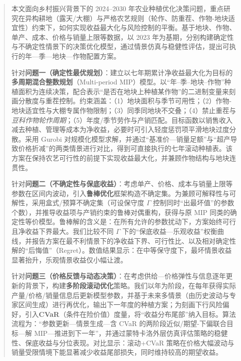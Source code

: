 



\begin{abstract}
    \begingroup
    \setlength{\baselineskip}{17.4pt}%
    
本文面向乡村振兴背景下的 2024--2030 年农业种植优化决策问题，重点研究在异构耕地（露天/大棚）与严格农艺规则（轮作、防重茬、作物-地块适宜性）约束下，如何实现收益最大化与风险控制的平衡。基于地块、作物、单产、成本、价格与销量上限等数据，以 2023 年为基期，分别构建确定性与不确定性情景下的决策优化模型，通过情景仿真与稳健性评估，提出可执行的年—季—地块—作物配置方案。
    
针对\textbf{问题一（确定性最优规划）}：建立以七年期累计净收益最大化为目标的\textbf{多周期混合整数规划}（Multi-period MIP）模型。以“年–季–地块–作物”种植面积为连续决策，配合表示“是否在地块上种植某作物”的二进制变量来刻画分散度与重茬控制。约束涵盖：（1）地块面积与季节可用性；（2）作物-地块适宜性与大棚专属作物限制；（3）同季同地块不交叠；（4）禁止重茬与\emph{豆科作物轮作周期}；（5）年度/季节劳作与产销匹配。目标函数以销售收入减去种植、管理等成本为净收益，必要时可引入轻度惩罚项平滑地块过度分散。采用 Gurobi 对规模化模型求解，并通过“基准价—销量足额”与“超产导致价格折减”的两类情景进行对比，得到可直接执行的七年滚动种植表。该方案在保持农艺可行性的前提下实现收益最大化，并兼顾作物结构与地块连贯性。
    
针对\textbf{问题二（不确定性与保底收益）}：考虑单产、价格、成本与销量上限等参数在区间内波动，引入\textbf{鲁棒优化}框架构造不确定集。为兼顾可解释性与可解性，采用盒式/预算不确定集（可设保守度 \(\Gamma\) 控制同时“出最坏值”的参数个数），并推导收益项与产销约束的鲁棒对偶重构，获得与原 MIP 同类的确定性等价模型。鲁棒解的含义是：在所有允许的参数扰动下，方案始终可行且净收益下界最大。我们比较不同 \(\Gamma\) 下的“保底收益—乐观收益”权衡曲线，并报告方案在最不利情景下的净收益下界、可行性比、以及相对确定性解的“后悔值”（Regret）。数值结果显示：在中等保守度下，最坏情景收益显著抬升，乐观情景收益仅小幅让渡。
    
针对\textbf{问题三（价格反馈与动态决策）}：在考虑供给—价格弹性与信息逐年更新的背景下，构建\textbf{多阶段滚动优化}策略。我们以年为阶段，在每年获得实际产量/价格/销量信息后更新模型参数，并基于未来多情景（由历史波动与专家区间生成）进行再优化，输出下一年度的种植方案；为刻画下行风险偏好，引入\textbf{CVaR}（条件在险价值）度量，将“收益分布尾部”纳入目标。算法流程为：“参数更新—情景生成—含 CVaR 的两阶段近似/期望-下偏联合目标—解 MIP—推进到下一年”，并通过蒙特卡洛外层仿真评估策略的稳健性、保底收益与分位表现。对比显示：滚动+CVaR 策略在价格大幅波动与销量受限情境下能显著减少收益尾部损失，同时维持较高的期望收益。
    

\end{abstract}
